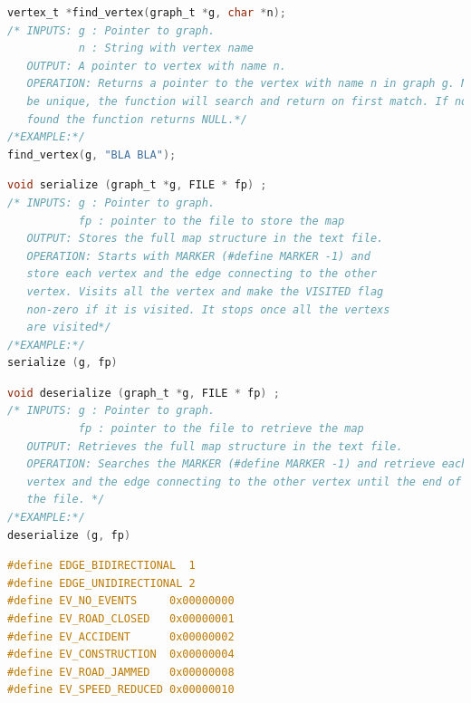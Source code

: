 \documentclass[10pt]{article}
\begin{document}
\begin{lstlisting}[language=C, caption= \textbf{API-5 find\_vertex}]
vertex_t *find_vertex(graph_t *g, char *n);
/* INPUTS: g : Pointer to graph.
           n : String with vertex name
   OUTPUT: A pointer to vertex with name n.
   OPERATION: Returns a pointer to the vertex with name n in graph g. Names must
   be unique, the function will search and return on first match. If no vertex is
   found the function returns NULL.*/
/*EXAMPLE:*/ 
find_vertex(g, "BLA BLA");
\end{lstlisting}

\begin{lstlisting}[language=C, caption= \textbf{API-6 serialize}]
void serialize (graph_t *g, FILE * fp) ;
/* INPUTS: g : Pointer to graph.
           fp : pointer to the file to store the map
   OUTPUT: Stores the full map structure in the text file.
   OPERATION: Starts with MARKER (#define MARKER -1) and 
   store each vertex and the edge connecting to the other 
   vertex. Visits all the vertex and make the VISITED flag 
   non-zero if it is visited. It stops once all the vertexs
   are visited*/
/*EXAMPLE:*/ 
serialize (g, fp)
\end{lstlisting}

\begin{lstlisting}[language=C, caption= \textbf{API-7 deserialize}]
void deserialize (graph_t *g, FILE * fp) ;
/* INPUTS: g : Pointer to graph.
           fp : pointer to the file to retrieve the map
   OUTPUT: Retrieves the full map structure in the text file.
   OPERATION: Searches the MARKER (#define MARKER -1) and retrieve each 
   vertex and the edge connecting to the other vertex until the end of 
   the file. */
/*EXAMPLE:*/ 
deserialize (g, fp)
\end{lstlisting}

\begin{lstlisting}[language=C, caption= \textbf{Macros}]
#define EDGE_BIDIRECTIONAL  1
#define EDGE_UNIDIRECTIONAL 2
#define EV_NO_EVENTS     0x00000000
#define EV_ROAD_CLOSED   0x00000001
#define EV_ACCIDENT      0x00000002
#define EV_CONSTRUCTION  0x00000004
#define EV_ROAD_JAMMED   0x00000008
#define EV_SPEED_REDUCED 0x00000010
\end{lstlisting}
\end{document}
